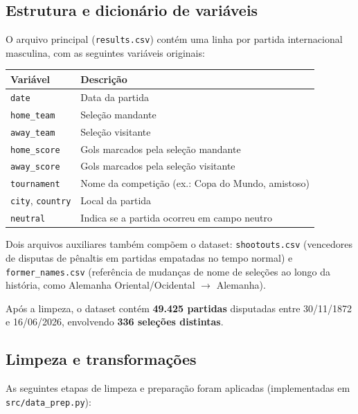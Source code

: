 \documentclass[12pt,a4paper]{article}
\begin{document}
\subsection{Estrutura e dicionário de variáveis}

O arquivo principal (\texttt{results.csv}) contém uma linha por partida internacional masculina, com as seguintes variáveis originais:

\begin{center}
\small
\begin{tabular}{@{}ll@{}}
\toprule
\textbf{Variável} & \textbf{Descrição} \\
\midrule
\texttt{date} & Data da partida \\
\texttt{home\_team} & Seleção mandante \\
\texttt{away\_team} & Seleção visitante \\
\texttt{home\_score} & Gols marcados pela seleção mandante \\
\texttt{away\_score} & Gols marcados pela seleção visitante \\
\texttt{tournament} & Nome da competição (ex.: Copa do Mundo, amistoso) \\
\texttt{city}, \texttt{country} & Local da partida \\
\texttt{neutral} & Indica se a partida ocorreu em campo neutro \\
\bottomrule
\end{tabular}
\end{center}

Dois arquivos auxiliares também compõem o dataset: \texttt{shootouts.csv} (vencedores de disputas de pênaltis em partidas empatadas no tempo normal) e \texttt{former\_names.csv} (referência de mudanças de nome de seleções ao longo da história, como Alemanha Oriental/Ocidental $\rightarrow$ Alemanha).

Após a limpeza, o dataset contém \textbf{49.425 partidas} disputadas entre 30/11/1872 e 16/06/2026, envolvendo \textbf{336 seleções distintas}.

\subsection{Limpeza e transformações}

As seguintes etapas de limpeza e preparação foram aplicadas (implementadas em \texttt{src/data\_prep.py}):
\end{document}
